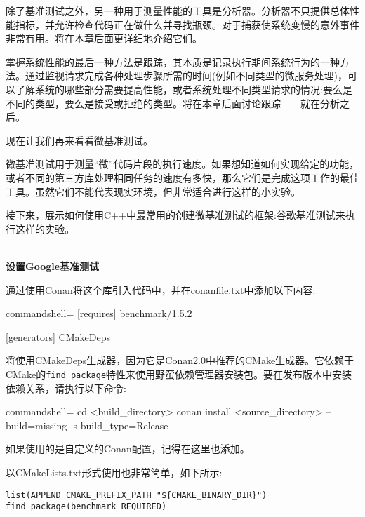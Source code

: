 除了基准测试之外，另一种用于测量性能的工具是分析器。分析器不只提供总体性能指标，并允许检查代码正在做什么并寻找瓶颈。对于捕获使系统变慢的意外事件非常有用。将在本章后面更详细地介绍它们。

掌握系统性能的最后一种方法是跟踪，其本质是记录执行期间系统行为的一种方法。通过监视请求完成各种处理步骤所需的时间(例如不同类型的微服务处理)，可以了解系统的哪些部分需要提高性能，或者系统处理不同类型请求的情况:要么是不同的类型，要么是接受或拒绝的类型。将在本章后面讨论跟踪——就在分析之后。

现在让我们再来看看微基准测试。


微基准测试用于测量“微”代码片段的执行速度。如果想知道如何实现给定的功能，或者不同的第三方库处理相同任务的速度有多快，那么它们是完成这项工作的最佳工具。虽然它们不能代表现实环境，但非常适合进行这样的小实验。

接下来，展示如何使用C++中最常用的创建微基准测试的框架:谷歌基准测试来执行这样的实验。

\hspace*{\fill} \\ %
\noindent
\textbf{设置Google基准测试}

通过使用Conan将这个库引入代码中，并在conanfile.txt中添加以下内容:

\begin{tcblisting}{commandshell={}}
[requires]
benchmark/1.5.2

[generators]
CMakeDeps	
\end{tcblisting}

将使用CMakeDeps生成器，因为它是Conan2.0中推荐的CMake生成器。它依赖于CMake的\texttt{find\_package}特性来使用野蛮依赖管理器安装包。要在发布版本中安装依赖关系，请执行以下命令:

\begin{tcblisting}{commandshell={}}
cd <build_directory>
conan install <source_directory> --build=missing -s build_type=Release
\end{tcblisting}

如果使用的是自定义的Conan配置，记得在这里也添加。

以CMakeLists.txt形式使用也非常简单，如下所示:

\begin{lstlisting}[style=styleCMake]
list(APPEND CMAKE_PREFIX_PATH "${CMAKE_BINARY_DIR}")
find_package(benchmark REQUIRED)
\end{lstlisting}

